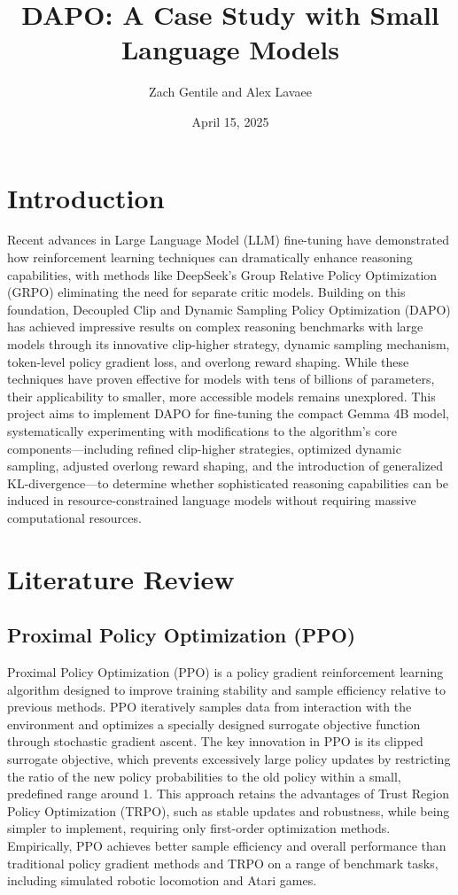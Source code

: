\documentclass[11pt, oneside]{article}   	%
\title{DAPO: A Case Study with Small Language Models}
\author{Zach Gentile and Alex Lavaee}
\date{April 15, 2025}
\begin{document}
\maketitle

\section*{Introduction}

Recent advances in Large Language Model (LLM) fine-tuning have demonstrated how reinforcement learning techniques can dramatically enhance reasoning capabilities, with methods like DeepSeek's Group Relative Policy Optimization (GRPO) eliminating the need for separate critic models. Building on this foundation, Decoupled Clip and Dynamic Sampling Policy Optimization (DAPO) has achieved impressive results on complex reasoning benchmarks with large models through its innovative clip-higher strategy, dynamic sampling mechanism, token-level policy gradient loss, and overlong reward shaping. While these techniques have proven effective for models with tens of billions of parameters, their applicability to smaller, more accessible models remains unexplored. This project aims to implement DAPO for fine-tuning the compact Gemma 4B model, systematically experimenting with modifications to the algorithm's core components—including refined clip-higher strategies, optimized dynamic sampling, adjusted overlong reward shaping, and the introduction of generalized KL-divergence—to determine whether sophisticated reasoning capabilities can be induced in resource-constrained language models without requiring massive computational resources.

\section*{Literature Review}
    
\subsection*{Proximal Policy Optimization (PPO) \cite{schulman2017proximalpolicyoptimizationalgorithms}}

Proximal Policy Optimization (PPO) is a policy gradient reinforcement learning algorithm designed to improve training stability and sample efficiency relative to previous methods. PPO iteratively samples data from interaction with the environment and optimizes a specially designed surrogate objective function through stochastic gradient ascent. The key innovation in PPO is its clipped surrogate objective, which prevents excessively large policy updates by restricting the ratio of the new policy probabilities to the old policy within a small, predefined range around 1. This approach retains the advantages of Trust Region Policy Optimization (TRPO), such as stable updates and robustness, while being simpler to implement, requiring only first-order optimization methods. Empirically, PPO achieves better sample efficiency and overall performance than traditional policy gradient methods and TRPO on a range of benchmark tasks, including simulated robotic locomotion and Atari games.
\end{document}
